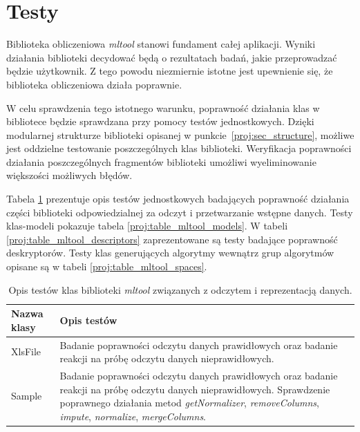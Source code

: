 \documentclass[../thesis.tex]{subfiles}
\begin{document}
\section{Testy}

Biblioteka obliczeniowa \emph{mltool} stanowi fundament całej aplikacji. Wyniki działania biblioteki decydować będą o rezultatach badań, jakie przeprowadzać będzie użytkownik. Z tego powodu niezmiernie istotne jest upewnienie się, że biblioteka obliczeniowa działa poprawnie. 

W celu sprawdzenia tego istotnego warunku, poprawność działania klas w bibliotece będzie sprawdzana przy pomocy testów jednostkowych. Dzięki modularnej strukturze biblioteki opisanej w punkcie~\ref{proj:sec_structure}, możliwe jest oddzielne testowanie poszczególnych klas biblioteki. Weryfikacja poprawności działania poszczególnych fragmentów biblioteki umożliwi wyeliminowanie większości możliwych błędów.

Tabela \ref{proj:table_mltool_input} prezentuje opis testów jednostkowych badających poprawność działania części biblioteki odpowiedzialnej za odczyt i przetwarzanie wstępne danych. Testy klas-modeli pokazuje tabela \ref{proj:table_mltool_models}. W tabeli \ref{proj:table_mltool_descriptors} zaprezentowane są testy badające poprawność deskryptorów. Testy klas generujących algorytmy wewnątrz grup algorytmów opisane są w tabeli \ref{proj:table_mltool_spaces}.

\begin{table}[h]
\begin{center}
\begin{tabular}{ | l | p{110mm} | }
\hline
\rowcolor{lightgray} Nazwa klasy & Opis testów \\\hline

XlsFile & Badanie poprawności odczytu danych prawidłowych oraz badanie reakcji na próbę odczytu danych nieprawidłowych. \\\hline
Sample & Badanie poprawności odczytu danych prawidłowych oraz badanie reakcji na próbę odczytu danych nieprawidłowych. Sprawdzenie poprawnego działania metod \emph{getNormalizer}, \emph{removeColumns}, \emph{impute}, \emph{normalize}, \emph{mergeColumns}.\\\hline

\end{tabular}
\caption{Opis testów klas biblioteki \emph{mltool} związanych z odczytem i reprezentacją danych.}
\label{proj:table_mltool_input}
\end{center}
\end{table}
\end{document}
